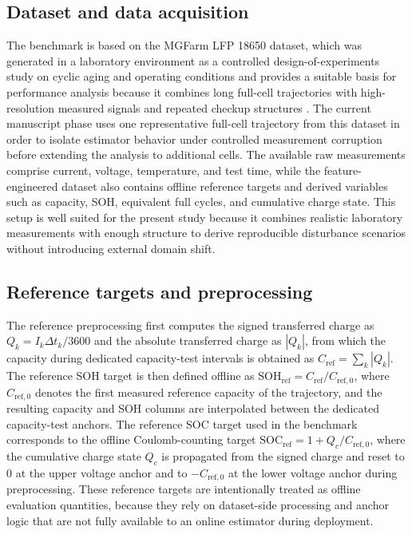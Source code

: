 \documentclass[review,nopreprintline]{elsarticle}
\begin{document}
\subsection{Dataset and data acquisition}
The benchmark is based on the MGFarm LFP 18650 dataset, which was generated in a laboratory environment as a controlled design-of-experiments study on cyclic aging and operating conditions and provides a suitable basis for performance analysis because it combines long full-cell trajectories with high-resolution measured signals and repeated checkup structures \cite{aqachtoulMGFARMIoTEdgeDriven2026,LFP_DoE_Cycle_Aging_Dataset,siebertzStatistischeVersuchsplanung2017}. The current manuscript phase uses one representative full-cell trajectory from this dataset in order to isolate estimator behavior under controlled measurement corruption before extending the analysis to additional cells. The available raw measurements comprise current, voltage, temperature, and test time, while the feature-engineered dataset also contains offline reference targets and derived variables such as capacity, SOH, equivalent full cycles, and cumulative charge state. This setup is well suited for the present study because it combines realistic laboratory measurements with enough structure to derive reproducible disturbance scenarios without introducing external domain shift.

\subsection{Reference targets and preprocessing}
The reference preprocessing first computes the signed transferred charge as $Q_k = I_k \Delta t_k / 3600$ and the absolute transferred charge as $|Q_k|$, from which the capacity during dedicated capacity-test intervals is obtained as $C_{\mathrm{ref}} = \sum_k |Q_k|$. The reference SOH target is then defined offline as $\mathrm{SOH}_{\mathrm{ref}} = C_{\mathrm{ref}} / C_{\mathrm{ref},0}$, where $C_{\mathrm{ref},0}$ denotes the first measured reference capacity of the trajectory, and the resulting capacity and SOH columns are interpolated between the dedicated capacity-test anchors. The reference SOC target used in the benchmark corresponds to the offline Coulomb-counting target $\mathrm{SOC}_{\mathrm{ref}} = 1 + Q_c / C_{\mathrm{ref},0}$, where the cumulative charge state $Q_c$ is propagated from the signed charge and reset to $0$ at the upper voltage anchor and to $-C_{\mathrm{ref},0}$ at the lower voltage anchor during preprocessing. These reference targets are intentionally treated as offline evaluation quantities, because they rely on dataset-side processing and anchor logic that are not fully available to an online estimator during deployment.
\end{document}

